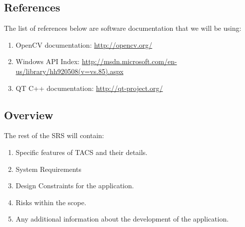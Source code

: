 \documentclass[titlepage]{article}
\begin{document}
\subsection{References}
The list of references below are software documentation that we will be using:
\begin{enumerate}
	\item OpenCV documentation: \href{http://opencv.org/}{\color{blue} http://opencv.org/}
	\item Windows API Index: \href{http://msdn.microsoft.com/en-us/library/hh920508(v=vs.85).aspx}{\color{blue} http://msdn.microsoft.com/en-us/library/hh920508(v=vs.85).aspx}
	\item QT C++ documentation: \href{http://qt-project.org/}{\color{blue} http://qt-project.org/}
\end{enumerate}

\subsection{Overview}
The rest of the SRS will contain:
\begin{enumerate}
	\item Specific features of TACS and their details.
	\item System Requirements
	\item Design Constraints for the application.
	\item Risks within the scope.
	\item Any additional information about the development of the application.
\end{enumerate}
\end{document}
